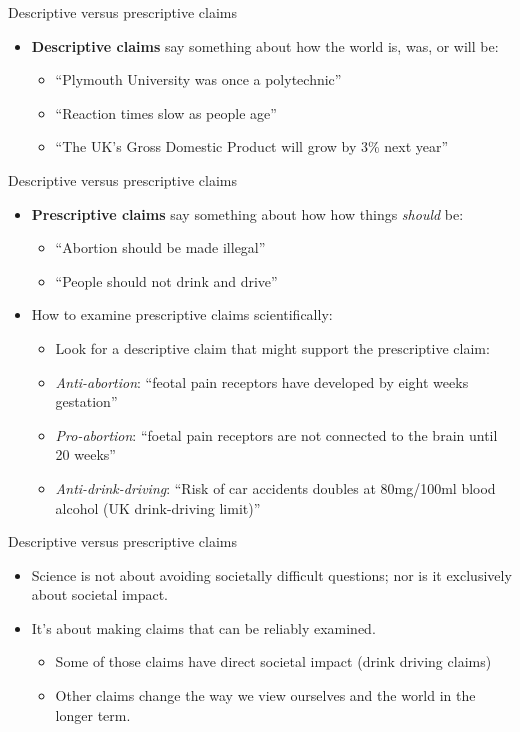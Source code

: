 \documentclass{beamer}
\begin{document}
\begin{frame}{Descriptive versus prescriptive claims}
	\begin{itemize}
		\item \textbf{Descriptive claims} say something about how the world is, was, or will be:
		\begin{itemize}
			\item ``Plymouth University was once a polytechnic''
			\item ``Reaction times slow as people age''
			\item ``The UK's Gross Domestic Product will grow by 3\% next year''
		\end{itemize}
	\end{itemize}
\end{frame}


\begin{frame}{Descriptive versus prescriptive claims}
	\begin{itemize}
		\item \textbf{Prescriptive claims} say something about how how things \emph{should} be:
		\begin{itemize}
			\item ``Abortion should be made illegal''
			\item ``People should not drink and drive''
		\end{itemize}
		\item How to examine prescriptive claims scientifically:
		\begin{itemize}
			\item Look for a descriptive claim that might support the prescriptive claim:
			\item \emph{Anti-abortion}: ``feotal pain receptors have developed by eight weeks gestation''
			\item \emph{Pro-abortion}: ``foetal pain receptors are not connected to the brain until 20 weeks''
			\item \emph{Anti-drink-driving}:  ``Risk of car accidents doubles at 80mg/100ml blood alcohol (UK drink-driving limit)''
		\end{itemize}
	\end{itemize}
\end{frame}
			

\begin{frame}{Descriptive versus prescriptive claims}
	\begin{itemize}		
		\item Science is not about avoiding societally difficult questions; nor is it exclusively about societal impact.
		\item It's about making claims that can be reliably examined.
		\begin{itemize}
			\item Some of those claims have direct societal impact (drink driving claims)
			\item Other claims change the way we view ourselves and the world in the longer term.
		\end{itemize}
	\end{itemize}
\end{frame}
\end{document}
